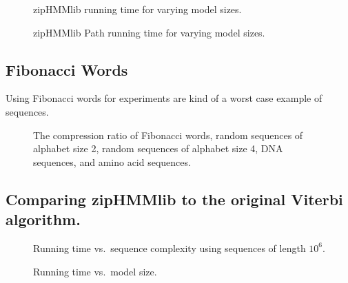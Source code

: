\begin{figure}[H]
  \centering
  
  \caption{zipHMMlib running time for varying model sizes.}
  \label{fig:assymptotic_viterbi_k}
\end{figure}

\begin{figure}[H]
  \centering
  
  \caption{zipHMMlib Path running time for varying model sizes.}
  \label{fig:assymptotic_viterbi_path_k}
\end{figure}

%   

\subsection{Fibonacci Words}
\label{sec:fibonacci-words}

Using Fibonacci words for experiments are kind of a worst case example of
sequences.

\begin{figure}[H]
  \centering
  
  \caption{The compression ratio of Fibonacci words, random sequences of
    alphabet size 2, random sequences of alphabet size 4, DNA
    sequences, and amino acid sequences.}
  \label{fig:compression_ratio}
\end{figure}

\subsection{Comparing zipHMMlib to the original Viterbi algorithm.}
\label{sec:comp-ziphmml-orig}

\begin{figure}[H]
  \centering
  
  \caption{Running time vs.\ sequence complexity using sequences of length $10^6$.}
  \label{fig:speedup_vs_complexity}
\end{figure}

\begin{figure}[H]
  \centering
  
  \caption{Running time vs.\ model size.}
  \label{fig:speedup_vs_k}
\end{figure}

